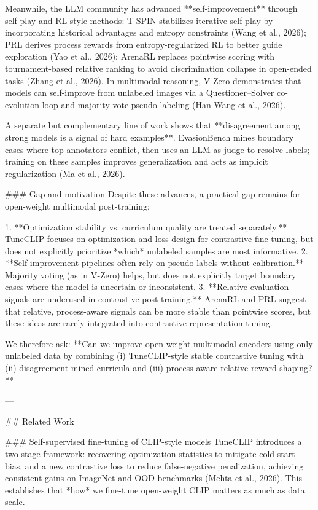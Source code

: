 Meanwhile, the LLM community has advanced **self-improvement** through self-play and RL-style methods: T‑SPIN stabilizes iterative self-play by incorporating historical advantages and entropy constraints (Wang et al., 2026); PRL derives process rewards from entropy-regularized RL to better guide exploration (Yao et al., 2026); ArenaRL replaces pointwise scoring with tournament-based relative ranking to avoid discrimination collapse in open-ended tasks (Zhang et al., 2026). In multimodal reasoning, V‑Zero demonstrates that models can self-improve from unlabeled images via a Questioner–Solver co-evolution loop and majority-vote pseudo-labeling (Han Wang et al., 2026).  

A separate but complementary line of work shows that **disagreement among strong models is a signal of hard examples**. EvasionBench mines boundary cases where top annotators conflict, then uses an LLM-as-judge to resolve labels; training on these samples improves generalization and acts as implicit regularization (Ma et al., 2026).  

### Gap and motivation  
Despite these advances, a practical gap remains for open-weight multimodal post-training:

1. **Optimization stability vs. curriculum quality are treated separately.** TuneCLIP focuses on optimization and loss design for contrastive fine-tuning, but does not explicitly prioritize *which* unlabeled samples are most informative.  
2. **Self-improvement pipelines often rely on pseudo-labels without calibration.** Majority voting (as in V‑Zero) helps, but does not explicitly target boundary cases where the model is uncertain or inconsistent.  
3. **Relative evaluation signals are underused in contrastive post-training.** ArenaRL and PRL suggest that relative, process-aware signals can be more stable than pointwise scores, but these ideas are rarely integrated into contrastive representation tuning.

We therefore ask: **Can we improve open-weight multimodal encoders using only unlabeled data by combining (i) TuneCLIP-style stable contrastive tuning with (ii) disagreement-mined curricula and (iii) process-aware relative reward shaping?**

---

## Related Work  

### Self-supervised fine-tuning of CLIP-style models  
TuneCLIP introduces a two-stage framework: recovering optimization statistics to mitigate cold-start bias, and a new contrastive loss to reduce false-negative penalization, achieving consistent gains on ImageNet and OOD benchmarks (Mehta et al., 2026). This establishes that *how* we fine-tune open-weight CLIP matters as much as data scale.

